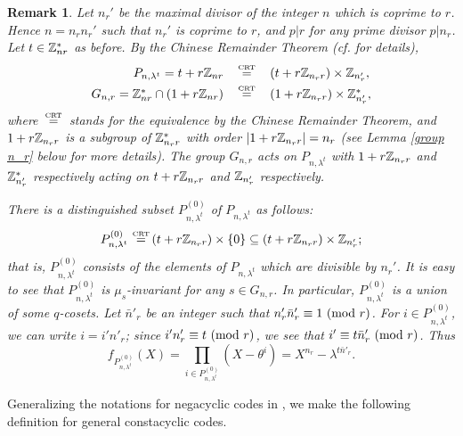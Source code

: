\documentclass{article}
\newtheorem{Remark}[Theorem]{Remark}
\numberwithin{equation}{section}
\numberwithin{table}{section}
\def\Z{{\Bbb Z}}
\def\CRT{\,\mathop{=}\limits^{\mbox{\rm\tiny CRT}}\,}
\begin{document}
\begin{Remark}\label{n_r'}\rm
Let $n_r'$ be the maximal divisor of the integer $n$ which is coprime to $r$.
Hence $n=n_rn_r'$ such that $n_r'$ is coprime to $r$, 
and $p|r$ for any prime divisor $p|n_r$. 
Let $t\in\Z_{nr}^*$ as before.
By the Chinese Remainder Theorem (cf. \cite[eq.(IV.3), eq.(IV.4)]{CDFL} for details),
\begin{equation}\label{CRT}
\begin{array}{rcl}
P_{n,\lambda^t}=t+r\Z_{nr}&\CRT & (t+r\Z_{n_r r})\times\Z_{n_r'},\\[3pt]
G_{n,r}=\Z_{nr}^*\cap(1+r\Z_{nr})
  &\CRT& (1+r\Z_{n_r r})\times \Z_{n_r'}^*,
\end{array}
\end{equation}
where $\CRT$ stands for the equivalence by the Chinese Remainder Theorem,
and $1+r\Z_{n_r r}$ is a subgroup of $\Z_{n_r r}^*$ with
order $|1+r\Z_{n_r r}|=n_r$ (see Lemma \ref{group n_r} below for more details).
The group  $G_{n,r}$ acts on $P_{n,\lambda^t}$ with $1+r\Z_{n_r r}$ and
$\Z_{n_r'}^*$ respectively acting on $t+r\Z_{n_r r}$ and $\Z_{n_r'}$
respectively.

There is a distinguished subset $P_{n,\lambda^{t}}^{(0)}$
of $P_{n,\lambda^t}$ as follows:
\begin{equation}\label{P^0}
 P_{n,\lambda^{t}}^{(0)}\CRT
  (t+r\Z_{n_r r})\times \{0\}\subseteq (t+r\Z_{n_r r})\times \Z_{n_r'};
\end{equation}
that is, $P_{n,\lambda^{t}}^{(0)}$ consists of
the elements of $P_{n,\lambda^t}$ which are divisible by $n_r'$.
It is easy to see that $P_{n,\lambda^t}^{(0)}$ is $\mu_s$-invariant
for any $s\in G_{n,r}$. In particular,
$P_{n,\lambda^t}^{(0)}$ is a union of some $q$-cosets.
Let $\bar n'_r$ be an integer such that $n'_r\bar n'_r\equiv 1~({\rm mod}~r)$.
For $i\in P_{n,\lambda^t}^{(0)}$, we can write $i=i'n'_r$;
since $i'n'_r\equiv t~({\rm mod}~r)$,
we see that $i'\equiv t\bar n'_r~({\rm mod}~r)$. Thus
$$
 f_{P_{n,\lambda^t}^{(0)}}(X)=
 \prod_{i\in P_{n,\lambda^t}^{(0)}}(X-\theta^i)
  =X^{n_r}-\lambda^{t\bar n'_r}.
$$
\end{Remark}

Generalizing the notations for negacyclic codes in \cite{Bl08},
we make the following definition for general constacyclic codes.
\end{document}
